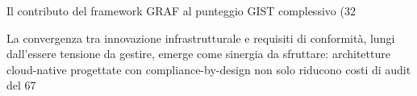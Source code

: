 Il contributo del framework GRAF al punteggio GIST complessivo (32%

La convergenza tra innovazione infrastrutturale e requisiti di conformità, lungi dall'essere tensione da gestire, emerge come sinergia da sfruttare: architetture cloud-native progettate con compliance-by-design non solo riducono costi di audit del 67%

\clearpage
\printbibliography[
    heading=subbibliography,
    title={Riferimenti Bibliografici del Capitolo 3},
]

